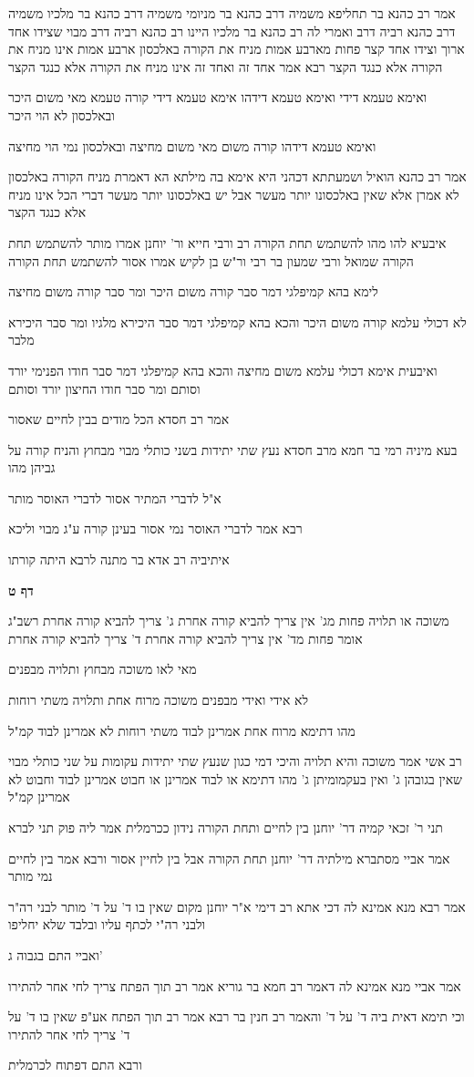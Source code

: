 \documentclass[12pt, openany]{book}
\newcommand{\sethebfont}{
\fontsize{10.5pt}{21.0pt} \selectfont
}
\newcommand{\textblock}[1]{
{\sethebfont #1\\}	
}
\newcommand{\sectname}{}
\newcommand{\newsection}[1]{
	\addcontentsline{toc}{section}{#1}
	\renewcommand{\sectname}{#1}	
	\vspace{-\baselineskip}
	\begin{center}
		\textbf{%
\fontsize{16pt}{16pt}\selectfont
			#1}
	\end{center}
	\vspace{-\baselineskip}
	\nopagebreak
}
\begin{document}
\textblock{אמר רב כהנא בר תחליפא משמיה דרב כהנא בר מניומי משמיה דרב כהנא בר מלכיו משמיה דרב כהנא רביה דרב ואמרי לה רב כהנא בר מלכיו היינו רב כהנא רביה דרב מבוי שצידו אחד ארוך וצידו אחד קצר פחות מארבע אמות מניח את הקורה באלכסון ארבע אמות אינו מניח את הקורה אלא כנגד הקצר רבא אמר אחד זה ואחד זה אינו מניח את הקורה אלא כנגד הקצר}
\textblock{ואימא טעמא דידי ואימא טעמא דידהו אימא טעמא דידי קורה טעמא מאי משום היכר ובאלכסון לא הוי היכר}
\textblock{ואימא טעמא דידהו קורה משום מאי משום מחיצה ובאלכסון נמי הוי מחיצה}
\textblock{אמר רב כהנא הואיל ושמעתתא דכהני היא אימא בה מילתא הא דאמרת מניח הקורה באלכסון לא אמרן אלא שאין באלכסונו יותר מעשר אבל יש באלכסונו יותר מעשר דברי הכל אינו מניח אלא כנגד הקצר}
\textblock{איבעיא להו מהו להשתמש תחת הקורה רב ורבי חייא ור' יוחנן אמרו מותר להשתמש תחת הקורה שמואל ורבי שמעון בר רבי ור"ש בן לקיש אמרו אסור להשתמש תחת הקורה}
\textblock{לימא בהא קמיפלגי דמר סבר קורה משום היכר ומר סבר קורה משום מחיצה}
\textblock{לא דכולי עלמא קורה משום היכר והכא בהא קמיפלגי דמר סבר היכירא מלגיו ומר סבר היכירא מלבר}
\textblock{ואיבעית אימא דכולי עלמא משום מחיצה והכא בהא קמיפלגי דמר סבר חודו הפנימי יורד וסותם ומר סבר חודו החיצון יורד וסותם}
\textblock{אמר רב חסדא הכל מודים בבין לחיים שאסור}
\textblock{בעא מיניה רמי בר חמא מרב חסדא נעץ שתי יתידות בשני כותלי מבוי מבחוץ והניח קורה על גביהן מהו}
\textblock{א"ל לדברי המתיר אסור לדברי האוסר מותר}
\textblock{רבא אמר לדברי האוסר נמי אסור בעינן קורה ע"ג מבוי וליכא}
\textblock{איתיביה רב אדא בר מתנה לרבא היתה קורתו}
\newsection{דף ט}
\textblock{משוכה או תלויה פחות מג' אין צריך להביא קורה אחרת ג' צריך להביא קורה אחרת רשב"ג אומר פחות מד' אין צריך להביא קורה אחרת ד' צריך להביא קורה אחרת}
\textblock{מאי לאו משוכה מבחוץ ותלויה מבפנים}
\textblock{לא אידי ואידי מבפנים משוכה מרוח אחת ותלויה משתי רוחות}
\textblock{מהו דתימא מרוח אחת אמרינן לבוד משתי רוחות לא אמרינן לבוד קמ"ל}
\textblock{רב אשי אמר משוכה והיא תלויה והיכי דמי כגון שנעץ שתי יתידות עקומות על שני כותלי מבוי שאין בגובהן ג' ואין בעקמומיתן ג' מהו דתימא או לבוד אמרינן או חבוט אמרינן לבוד וחבוט לא אמרינן קמ"ל}
\textblock{תני ר' זכאי קמיה דר' יוחנן בין לחיים ותחת הקורה נידון ככרמלית אמר ליה פוק תני לברא}
\textblock{אמר אביי מסתברא מילתיה דר' יוחנן תחת הקורה אבל בין לחיין אסור ורבא אמר בין לחיים נמי מותר}
\textblock{אמר רבא מנא אמינא לה דכי אתא רב דימי א"ר יוחנן מקום שאין בו ד' על ד' מותר לבני רה"ר ולבני רה"י לכתף עליו ובלבד שלא יחליפו}
\textblock{ואביי התם בגבוה ג'}
\textblock{אמר אביי מנא אמינא לה דאמר רב חמא בר גוריא אמר רב תוך הפתח צריך לחי אחר להתירו}
\textblock{וכי תימא דאית ביה ד' על ד' והאמר רב חנין בר רבא אמר רב תוך הפתח אע"פ שאין בו ד' על ד' צריך לחי אחר להתירו}
\textblock{ורבא התם דפתוח לכרמלית}
\end{document}
